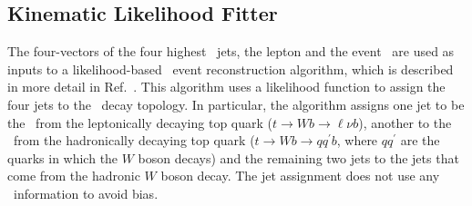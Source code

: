 \documentclass[letterpaper,12pt]{article}
\begin{document}
\subsection{Kinematic Likelihood Fitter}
\label{KLFitter}
The four-vectors of the four highest \pt\ jets, the lepton and the
event \MET\ are used as inputs to a likelihood-based \ttbar\ event
reconstruction algorithm, which is described in more detail in
Ref.~\cite{ERDMANN201418}. This algorithm uses a likelihood function
to assign the four jets to the \ttbar\ decay topology. In particular,
the algorithm assigns one jet to be the \bjet\ from the leptonically
decaying top quark ($t\to Wb \to \ell \nu b$), another to the \bjet\
from the hadronically decaying top quark ($t\to Wb \to qq^\prime b$,
where $qq^\prime$ are the quarks in which the $W$ boson decays) and
the remaining two jets to the jets that come from the hadronic $W$
boson decay. The jet assignment does not use any \btagging\ information
to avoid bias.
\end{document}
